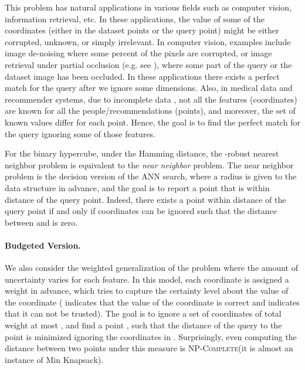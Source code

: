 \documentclass[12pt]{article}\usepackage[cm]{fullpage}
\newlength{\savedparindent}
\newcommand{\SaveIndent}{\setlength{\savedparindent}{\parindent}}
\newcommand{\Term}[1]{\textsf{#1}}
\theoremstyle{remark}\theoremheaderfont{\sf}\theorembodyfont{\upshape}\newtheorem{defn}[theorem]{Definition}
\numberwithin{figure}{section}\numberwithin{table}{section}\numberwithin{equation}{section}
\newcommand{\ANN}{\Term{ANN}\xspace}\newcommand{\NN}{\Term{NN}\xspace}
\providecommand{\ProblemC}[1]{\textsf{#1}}
\providecommand{\ComplexityClass}[1]{{{{\textsc{#1}}}}}
\providecommand{\NPComplete}{\ComplexityClass{NP-Complete}\xspace}
\begin{document}
This problem has natural applications in various fields such as
computer vision, information retrieval, etc.  In these applications,
the value of some of the coordinates (either in the dataset points or
the query point) might be either corrupted, unknown, or simply
irrelevant.  In computer vision, examples include image de-noising
where some percent of the pixels are corrupted, or image retrieval
under partial occlusion (e.g. see \cite{he-scump-07}), where some part
of the query or the dataset image has been occluded.  In these
applications there exists a perfect match for the query after we
ignore some dimensions.  Also, in medical data and recommender
systems, due to incomplete data \cite{swcsr-mimde-09,
   cfvrs-mdmdi-13, wcnk-shmde-13}, not all the features (coordinates)
are known for all the people/recommendations (points), and moreover,
the set of known values differ for each point.  Hence, the goal is to
find the perfect match for the query ignoring some of those features.

For the binary hypercube, under the Hamming distance, the -robust
nearest neighbor problem is equivalent to the \emph{near neighbor}
problem. The near neighbor problem is the decision version of the \ANN
search, where a radius  is given to the data structure in
advance, and the goal is to report a point that is within distance
 of the query point. Indeed, there exists a point  within
distance  of the query point  if and only if 
coordinates can be ignored such that the distance between  and
 is zero.

\paragraph{Budgeted Version.}

We also consider the weighted generalization of the problem where the
amount of uncertainty varies for each feature. In this model, each
coordinate is assigned a weight  in advance, which
tries to capture the certainty level about the value of the coordinate
( indicates that the value of the coordinate is correct and
 indicates that it can not be trusted). The goal is to ignore a
set of coordinates  of total weight at most , and find
a point , such that the distance of the query to the
point  is minimized ignoring the coordinates in
. Surprisingly, even computing the distance between two
points under this measure is \NPComplete (it is almost an instance of
\ProblemC{Min Knapsack}).


\SaveIndent 
\end{document}
